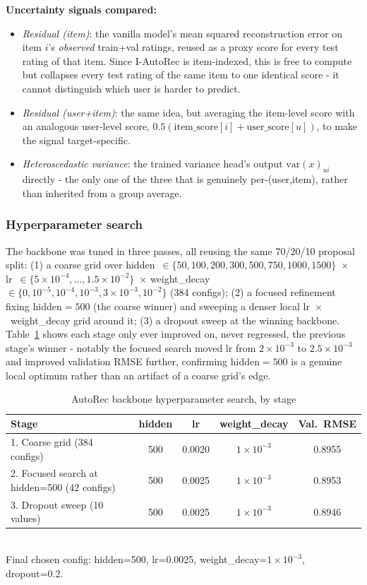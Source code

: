 \textbf{Uncertainty signals compared:}
\begin{itemize}
  \item \emph{Residual (item)}: the vanilla model's mean squared
        reconstruction error on item $i$'s \emph{observed} train+val
        ratings, reused as a proxy score for every test rating of that
        item. Since I-AutoRec is item-indexed, this is free to compute but
        collapses every test rating of the same item to one identical
        score - it cannot distinguish which user is harder to predict.
  \item \emph{Residual (user+item)}: the same idea, but averaging the
        item-level score with an analogous user-level score,
        $0.5(\text{item\_score}[i] + \text{user\_score}[u])$, to make the
        signal target-specific.
  \item \emph{Heteroscedastic variance}: the trained variance head's output
        $\mathrm{var}(x)_{ui}$ directly - the only one of the three that is
        genuinely per-(user,item), rather than inherited from a group
        average.
\end{itemize}

\subsubsection{Hyperparameter search}

The backbone was tuned in three passes, all reusing the same 70/20/10
proposal split: (1) a coarse grid over
hidden~$\in\{50,100,200,300,500,750,1000,1500\}$~$\times$
lr~$\in\{5{\times}10^{-4},\ldots,1.5{\times}10^{-2}\}$~$\times$
weight\_decay~$\in\{0,10^{-5},10^{-4},10^{-3},3{\times}10^{-3},10^{-2}\}$
(384 configs); (2) a focused refinement fixing hidden$=500$ (the coarse
winner) and sweeping a denser local lr~$\times$~weight\_decay grid around
it; (3) a dropout sweep at the winning backbone. Table~\ref{tab:autorec2-hp}
shows each stage only ever improved on, never regressed, the previous
stage's winner - notably the focused search moved lr from $2{\times}10^{-3}$
to $2.5{\times}10^{-3}$ and improved validation RMSE further, confirming
hidden$=500$ is a genuine local optimum rather than an artifact of a coarse
grid's edge.

\begin{table}[htbp]
\centering
\caption{AutoRec backbone hyperparameter search, by stage}
\label{tab:autorec2-hp}
\begin{tabular}{lcccc}
\toprule
Stage & hidden & lr & weight\_decay & Val.\ RMSE \\
\midrule
1. Coarse grid (384 configs)      & 500 & 0.0020 & $1{\times}10^{-3}$ & 0.8955 \\
2. Focused search at hidden=500 (42 configs) & 500 & 0.0025 & $1{\times}10^{-3}$ & 0.8953 \\
3. Dropout sweep (10 values)      & 500 & 0.0025 & $1{\times}10^{-3}$ & 0.8946 \\
\bottomrule
\end{tabular}
\vspace{2pt}
\\ \footnotesize Final chosen config: hidden=500, lr=0.0025, weight\_decay=$1{\times}10^{-3}$, dropout=0.2.
\end{table}

